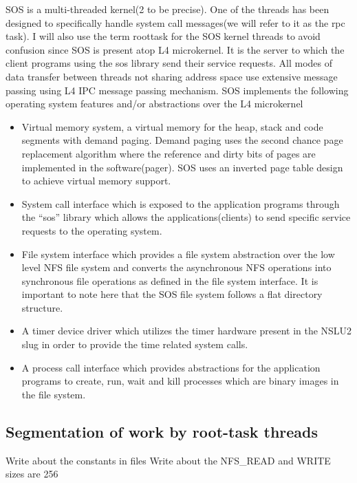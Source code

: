 \documentclass[a4paper, 11pt]{article}
\begin{document}
SOS is a multi-threaded kernel(2 to be precise). One of the threads
has been designed to specifically handle system call messages(we will
refer to it as the rpc task). I will also use the term roottask for
the SOS kernel threads to avoid confusion since SOS is present atop L4 
microkernel. It is
the server to which the client programs using the sos library send
their service requests. All modes of data transfer between threads not
sharing address space use extensive message passing using L4 IPC
message passing mechanism. SOS implements the following operating
system features and/or abstractions over the L4 microkernel
\begin{itemize}
\item Virtual memory system, a virtual memory for the heap, stack and
  code segments with demand paging. Demand paging uses the second
  chance page replacement algorithm where the reference and dirty bits
  of pages are implemented in the software(pager). SOS uses an
  inverted page table design to achieve virtual memory support.
\item System call interface which is exposed to the application
  programs through the ``sos'' library which allows the
  applications(clients) to send specific service requests to the
  operating system.
\item File system interface which provides a file system abstraction
  over the low level NFS file system \cite{nfs-rfc} and converts the 
  asynchronous NFS
  operations into synchronous file operations as defined in the file
  system interface. It is important to note here that the SOS file
  system follows a flat directory structure.
\item A timer device driver which utilizes the timer hardware present
  in the NSLU2 slug in order to provide the time related system calls.
\item A process call interface which provides abstractions for the
  application programs to create, run, wait and kill processes which
  are binary images in the file system.
\end{itemize} 

\subsection{Segmentation of work by root-task threads}

Write about the constants in files 
Write about the NFS\_READ and WRITE sizes are 256
\newpage
\end{document}
